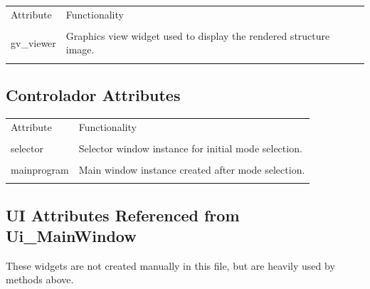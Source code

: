 ﻿\documentclass[11pt,a4paper]{article}
\begin{document}
\begin{longtable}{|p{}|p{}|}
\hline
Attribute & Functionality \\\\
\hline
gv\_viewer & Graphics view widget used to display the rendered structure image. \\\\
\hline
\end{longtable}


\subsection*{Controlador Attributes}

\begin{longtable}{|p{}|p{}|}
\hline
Attribute & Functionality \\\\
\hline
selector & Selector window instance for initial mode selection. \\\\
\hline
mainprogram & Main window instance created after mode selection. \\\\
\hline
\end{longtable}


\subsection*{UI Attributes Referenced from Ui\_MainWindow}

These widgets are not created manually in this file, but are heavily used by methods above.
\end{document}
